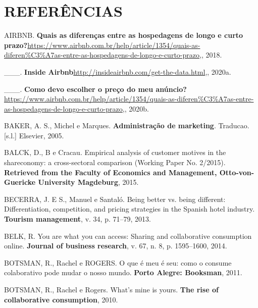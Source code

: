 \documentclass[
	12pt,				%
	a4paper,		%
	oneside,    %
	chapter=TITLE,		   %
	section=TITLE,		   %
	subsection=TITLE,	   %
	subsubsection=TITLE, %
	english,			%
	french,				%
	spanish,			%
	brazil,				%
]{abntex2}
\begin{document}
\newpage

\hypertarget{referuxeancias}{%
\chapter*{REFERÊNCIAS}\label{referuxeancias}}

\hypertarget{refs}{}
\leavevmode\hypertarget{ref-airbnbperiodolongo}{}%
AIRBNB. \textbf{Quais as diferenças entre as hospedagens de longo e
curto
prazo?}\url{https://www.airbnb.com.br/help/article/1354/quais-as-diferen\%C3\%A7as-entre-as-hospedagens-de-longo-e-curto-prazo},,
2018.

\leavevmode\hypertarget{ref-inside}{}%
\_\_\_. \textbf{Inside
Airbnb}\url{http://insideairbnb.com/get-the-data.html},, 2020a.

\leavevmode\hypertarget{ref-precoairbnb}{}%
\_\_\_. \textbf{Como devo escolher o preço do meu
anúncio?}\url{https://www.airbnb.com.br/help/article/1354/quais-as-diferen\%C3\%A7as-entre-as-hospedagens-de-longo-e-curto-prazo},,
2020b.

\leavevmode\hypertarget{ref-baker2005administraccao}{}%
BAKER, A. S., Michel e Marques. \textbf{Administração de marketing}.
Traducao. {[}s.l.{]} Elsevier, 2005.

\leavevmode\hypertarget{ref-balck2015empirical}{}%
BALCK, D., B e Cracau. Empirical analysis of customer motives in the
shareconomy: a cross-sectoral comparison (Working Paper No. 2/2015).
\textbf{Retrieved from the Faculty of Economics and Management,
Otto-von-Guericke University Magdeburg}, 2015.

\leavevmode\hypertarget{ref-becerra2013being}{}%
BECERRA, J. E S., Manuel e Santaló. Being better vs. being different:
Differentiation, competition, and pricing strategies in the Spanish
hotel industry. \textbf{Tourism management}, v. 34, p. 71--79, 2013.

\leavevmode\hypertarget{ref-belk2014you}{}%
BELK, R. You are what you can access: Sharing and collaborative
consumption online. \textbf{Journal of business research}, v. 67, n. 8,
p. 1595--1600, 2014.

\leavevmode\hypertarget{ref-botsman2011meu}{}%
BOTSMAN, R., Rachel e ROGERS. O que é meu é seu: como o consume
colaborativo pode mudar o nosso mundo. \textbf{Porto Alegre: Booksman},
2011.

\leavevmode\hypertarget{ref-botsman2010s}{}%
BOTSMAN, R., Rachel e Rogers. What's mine is yours. \textbf{The rise of
collaborative consumption}, 2010.
\end{document}
